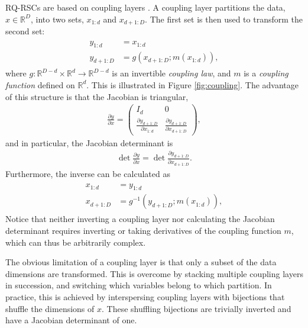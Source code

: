 \documentclass[twocolumn,twocolappendix]{aastex631}
\newcommand{\R}{\mathbb{R}}
\begin{document}
RQ-RSCs are based on coupling layers \citep{dinh2015, dinh2017}.
A coupling layer partitions the data, $x \in \R^D$, into two sets, $x_{1:d}$ and $x_{d+1:D}$.
The first set is then used to transform the second set:
\begin{align}
    \begin{split}
    y^{}_{1:d} &= x^{}_{1:d} \\
    y^{}_{d+1:D} &= g(x^{}_{d+1:D}; m(x^{}_{1:d})),
    \end{split}
\end{align}
where $g : \R^{D-d} \times \R^d \to \R^{D-d}$ is an invertible \emph{coupling law}, and $m$ is a \emph{coupling function} defined on $\R^d$.
This is illustrated in Figure \ref{fig:coupling}.
The advantage of this structure is that the Jacobian is triangular,
\begin{align}
    \frac{\partial y}{\partial x} =
    \begin{pmatrix}
         I_d & 0 \\
         \frac{\partial y^{}_{d+1:D}}{\partial x^{}_{1:d}}
         & \frac{\partial y^{}_{d+1:D}}{\partial x^{}_{d+1:D}}
    \end{pmatrix},
\end{align}
and in particular, the Jacobian determinant is
\begin{align}
    \det \frac{\partial y}{\partial x} = \det \frac{\partial y^{}_{d+1:D}}{\partial x^{}_{d+1:D}}.
\end{align}
Furthermore, the inverse can be calculated as
\begin{align}
    \begin{split}
    x^{}_{1:d} &= y^{}_{1:d} \\
    x^{}_{d+1:D} &= g^{-1}(y^{}_{d+1:D}; m(x^{}_{1:d})),
    \end{split}
\end{align}
Notice that neither inverting a coupling layer nor calculating the Jacobian determinant requires inverting or taking derivatives of the coupling function $m$, which can thus be arbitrarily complex.

The obvious limitation of a coupling layer is that only a subset of the data dimensions are transformed.
This is overcome by stacking multiple coupling layers in succession, and switching which variables belong to which partition.
In practice, this is achieved by interspersing coupling layers with bijections that shuffle the dimensions of $x$.
These shuffling bijections are trivially inverted and have a Jacobian determinant of one.
\end{document}
